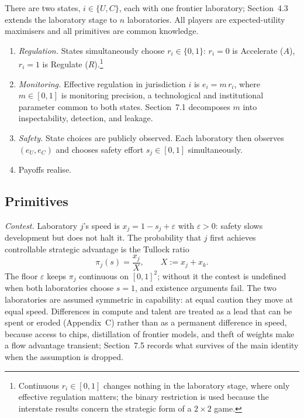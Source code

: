\documentclass[11pt]{article}
\theoremstyle{plain}
\theoremstyle{definition}
\theoremstyle{remark}
\begin{document}
There are two states, $i\in\{U,C\}$, each with one frontier laboratory; Section~4.3 extends the laboratory stage to $n$ laboratories. All players are expected-utility maximisers and all primitives are common knowledge.

\begin{enumerate}
\item \emph{Regulation.} States simultaneously choose $r_i\in\{0,1\}$: $r_i=0$ is Accelerate ($A$), $r_i=1$ is Regulate ($R$).\footnote{Continuous $r_i\in[0,1]$ changes nothing in the laboratory stage, where only effective regulation matters; the binary restriction is used because the interstate results concern the strategic form of a $2\times2$ game.}
\item \emph{Monitoring.} Effective regulation in jurisdiction $i$ is $e_i=m\,r_i$, where $m\in[0,1]$ is monitoring precision, a technological and institutional parameter common to both states. Section~7.1 decomposes $m$ into inspectability, detection, and leakage.
\item \emph{Safety.} State choices are publicly observed. Each laboratory then observes $(e_U,e_C)$ and chooses safety effort $s_j\in[0,1]$ simultaneously.
\item Payoffs realise.
\end{enumerate}

\subsection{Primitives}

\emph{Contest.} Laboratory $j$'s speed is $x_j=1-s_j+\varepsilon$ with $\varepsilon>0$: safety slows development but does not halt it. The probability that $j$ first achieves controllable strategic advantage is the Tullock ratio
\begin{equation}
\pi_j(s)=\frac{x_j}{X}, \qquad X:=x_j+x_k .
\label{eq:contest}
\end{equation}
The floor $\varepsilon$ keeps $\pi_j$ continuous on $[0,1]^2$; without it the contest is undefined when both laboratories choose $s=1$, and existence arguments fail. The two laboratories are assumed symmetric in capability: at equal caution they move at equal speed. Differences in compute and talent are treated as a lead that can be spent or eroded (Appendix~C) rather than as a permanent difference in speed, because access to chips, distillation of frontier models, and theft of weights make a flow advantage transient; Section~7.5 records what survives of the main identity when the assumption is dropped.
\end{document}

